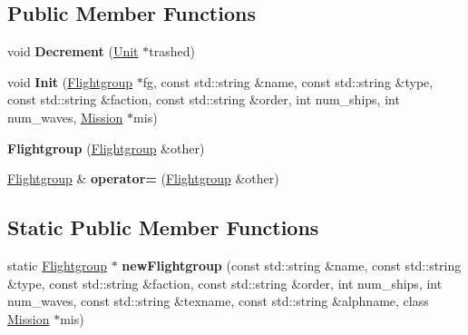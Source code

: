 \subsection*{Public Member Functions}
\begin{DoxyCompactItemize}
\item 
void {\bfseries Decrement} (\hyperlink{classUnit}{Unit} $\ast$trashed)\hypertarget{classFlightgroup_a7459b7a546007c3f08dbc988b37ae4f6}{}\label{classFlightgroup_a7459b7a546007c3f08dbc988b37ae4f6}

\item 
void {\bfseries Init} (\hyperlink{classFlightgroup}{Flightgroup} $\ast$fg, const std\+::string \&name, const std\+::string \&type, const std\+::string \&faction, const std\+::string \&order, int num\+\_\+ships, int num\+\_\+waves, \hyperlink{classMission}{Mission} $\ast$mis)\hypertarget{classFlightgroup_a426fc5314ac8bcb25653601da6044ba3}{}\label{classFlightgroup_a426fc5314ac8bcb25653601da6044ba3}

\item 
{\bfseries Flightgroup} (\hyperlink{classFlightgroup}{Flightgroup} \&other)\hypertarget{classFlightgroup_a6298a3de16369fdba5a9323a4bb57851}{}\label{classFlightgroup_a6298a3de16369fdba5a9323a4bb57851}

\item 
\hyperlink{classFlightgroup}{Flightgroup} \& {\bfseries operator=} (\hyperlink{classFlightgroup}{Flightgroup} \&other)\hypertarget{classFlightgroup_a3de9b1eb3b428d4ea3469e9713a698c6}{}\label{classFlightgroup_a3de9b1eb3b428d4ea3469e9713a698c6}

\end{DoxyCompactItemize}
\subsection*{Static Public Member Functions}
\begin{DoxyCompactItemize}
\item 
static \hyperlink{classFlightgroup}{Flightgroup} $\ast$ {\bfseries new\+Flightgroup} (const std\+::string \&name, const std\+::string \&type, const std\+::string \&faction, const std\+::string \&order, int num\+\_\+ships, int num\+\_\+waves, const std\+::string \&texname, const std\+::string \&alphname, class \hyperlink{classMission}{Mission} $\ast$mis)\hypertarget{classFlightgroup_ab69035f87d78cb356e73787267527496}{}\label{classFlightgroup_ab69035f87d78cb356e73787267527496}

\end{DoxyCompactItemize}
